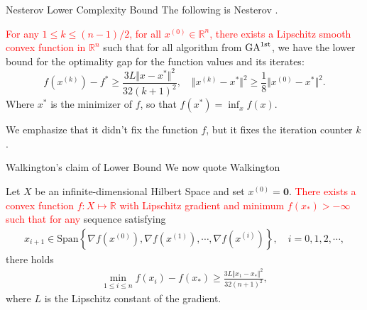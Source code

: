 \documentclass[11pt]{beamer}
\theoremstyle{definition}
\begin{document}
    \begin{frame}{Nesterov Lower Complexity Bound}
        The following is Nesterov \cite[Thm 2.1.7]{nesterov_lecture_2018}. 
        \begin{theorem}\label{thm:nesterov_lower_bnd}
            \textcolor{red}{For any $1\le k \le (n - 1)/2$, for all $x^{(0)}\in \mathbb R^n$, there exists a Lipschitz smooth convex function in $\mathbb R^n$} such that for all algorithm from $\text{GA}^{\text{1st}}$, we have the lower bound for the optimality gap for the function values and its iterates: 
            \[
                f\left(x^{(k)}\right) - f^* \ge 
                \frac{3L \Vert x - x^*\Vert^2}{32(k + 1)^2}, 
                \quad \Vert x^{(k)} - x^*\Vert^2 \ge \frac{1}{8} \Vert x^{(0)} - x^*\Vert^2.     
            \]
            Where $x^*$ is the minimizer of $f$, so that $f(x^*) = \inf_{x}f(x)$. 
        \end{theorem}
        We emphasize that it didn't fix the function $f$, but it fixes the iteration counter $k$. 
        
    \end{frame}
    \begin{frame}{Walkington's claim of Lower Bound}
        We now quote Walkington \cite[theorem 2.4]{noel_nesterovs_nodate}
        \begin{theorem}
            Let $X$ be an infinite-dimensional Hilbert Space and set $x^{(0)} =\mathbf 0$. \textcolor{red}{There exists a convex function $f: X\mapsto \mathbb R$ with Lipschitz gradient and minimum $f(x_*) > -\infty$ such that for any} sequence satisfying 
            \begin{align*}
                x_{i + 1}\in \text{Span}\left\lbrace
                    \nabla f(x^{(0)}), \nabla f(x^{(1)}), \cdots, \nabla f(x^{(i)})
                \right\rbrace, 
                \quad i = 0, 1, 2, \cdots, 
            \end{align*}
            there holds 
            \begin{align*}
                \min_{1\le i \le n}
                f(x_i) - f(x_*) \ge 
                \frac{3L\Vert x_1 - x_*\Vert^2}{32(n + 1)^2}, 
            \end{align*}
            where $L$ is the Lipschitz constant of the gradient. 
        \end{theorem}\label{thm:walkington_lowerbound}
    \end{frame}
\end{document}
